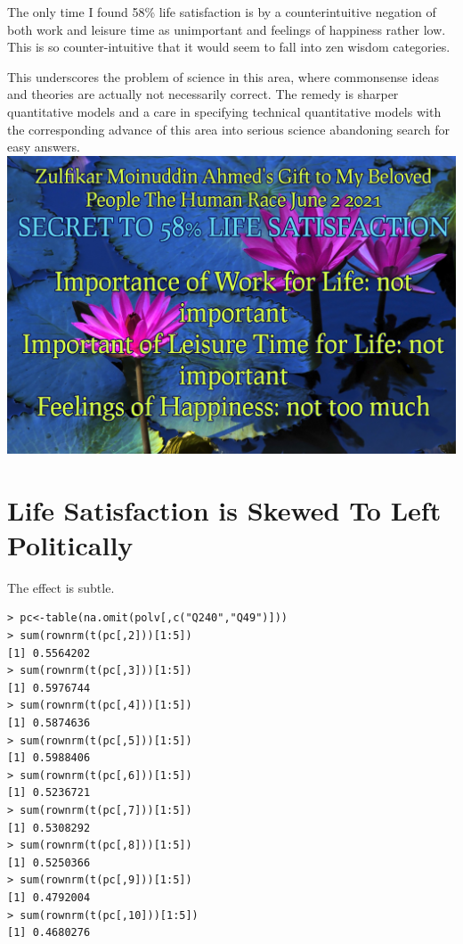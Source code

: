 \documentclass{amsart}
\begin{document}
The only time I found 58\% life satisfaction is by a counterintuitive negation of both work and leisure time as unimportant and feelings of happiness rather low.  This is so counter-intuitive that it would seem to fall into zen wisdom categories.  

This underscores the problem of science in this area, where commonsense ideas and theories are actually not necessarily correct.  The remedy is sharper quantitative models and a care in specifying technical quantitative models with the corresponding advance of this area into serious science abandoning search for easy answers.
\includegraphics[scale=0.6]{secret.jpg}

\section{Life Satisfaction is Skewed To Left Politically}

The effect is subtle.

\begin{verbatim}
> pc<-table(na.omit(polv[,c("Q240","Q49")]))
> sum(rownrm(t(pc[,2]))[1:5])
[1] 0.5564202
> sum(rownrm(t(pc[,3]))[1:5])
[1] 0.5976744
> sum(rownrm(t(pc[,4]))[1:5])
[1] 0.5874636
> sum(rownrm(t(pc[,5]))[1:5])
[1] 0.5988406
> sum(rownrm(t(pc[,6]))[1:5])
[1] 0.5236721
> sum(rownrm(t(pc[,7]))[1:5])
[1] 0.5308292
> sum(rownrm(t(pc[,8]))[1:5])
[1] 0.5250366
> sum(rownrm(t(pc[,9]))[1:5])
[1] 0.4792004
> sum(rownrm(t(pc[,10]))[1:5])
[1] 0.4680276
\end{verbatim}
\end{document}
